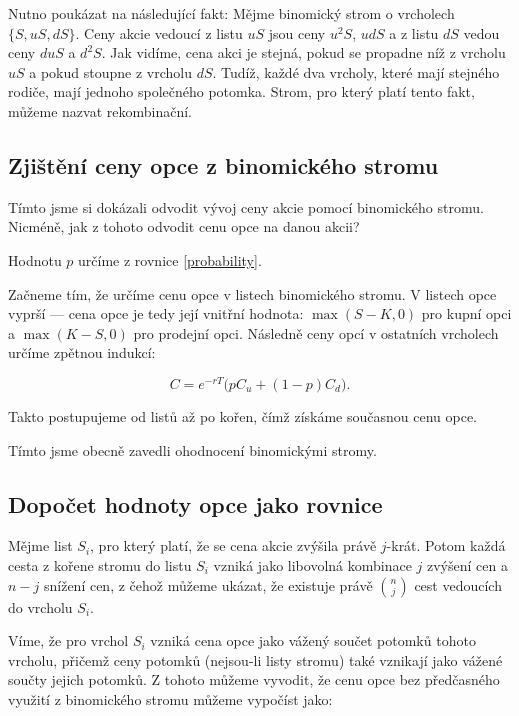 \documentclass{article}
\begin{document}
Nutno poukázat na následující fakt: Mějme binomický strom o vrcholech $\{S, uS, dS\}$. Ceny akcie vedoucí z listu $uS$ jsou ceny $u^2S$, $udS$ a z listu $dS$ vedou ceny $duS$ a $d^2S$. Jak vidíme, cena akci je stejná, pokud se propadne níž z vrcholu $uS$ a pokud stoupne z vrcholu $dS$. Tudíž, každé dva vrcholy, které mají stejného rodiče, mají jednoho společného potomka. Strom, pro který platí tento fakt, můžeme nazvat rekombinační.

\subsection{Zjištění ceny opce z binomického stromu}

Tímto jsme si dokázali odvodit vývoj ceny akcie pomocí binomického stromu. Nicméně, jak z tohoto odvodit cenu opce na danou akcii?

Hodnotu $p$ určíme z rovnice \ref{probability}. 

Začneme tím, že určíme cenu opce v listech binomického stromu. %
V listech opce vyprší — cena opce je tedy její vnitřní hodnota: $\max(S - K, 0)$ pro kupní opci a $\max(K - S, 0)$ pro prodejní opci. Následně ceny opcí v ostatních vrcholech určíme zpětnou indukcí: %

\begin{equation}
  C = e^{-rT}\bigl(p C_u + (1-p) C_d\bigr).
\end{equation}

Takto postupujeme od listů až po kořen, čímž získáme současnou cenu opce.

Tímto jsme obecně zavedli ohodnocení binomickými stromy. 

\subsection{Dopočet hodnoty opce jako rovnice}

Mějme list $S_i$, pro který platí, že se cena akcie zvýšila právě $j$-krát. Potom každá cesta z kořene stromu do listu $S_i$ vzniká jako libovolná kombinace $j$ zvýšení cen a $n-j$ snížení cen, z čehož můžeme ukázat, že existuje právě $\binom{n}{j}$ cest vedoucích do vrcholu $S_i$.

Víme, že pro vrchol $S_i$ vzniká cena opce jako vážený součet potomků tohoto vrcholu, přičemž ceny potomků (nejsou-li listy stromu) také vznikají jako vážené součty jejich potomků. Z tohoto můžeme vyvodit, že cenu opce bez předčasného využití z binomického stromu můžeme vypočíst jako:
\end{document}
